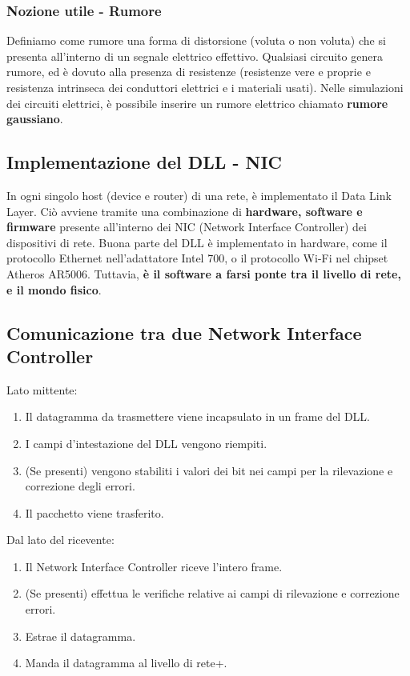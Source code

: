 \subsubsection{Nozione utile - Rumore}
Definiamo come rumore una forma di distorsione (voluta o non voluta) che si presenta all'interno di un segnale elettrico effettivo. Qualsiasi circuito genera rumore, ed è dovuto alla presenza di resistenze (resistenze vere e proprie e resistenza intrinseca dei conduttori elettrici e i materiali usati). Nelle simulazioni dei circuiti elettrici, è possibile inserire un rumore elettrico chiamato \textbf{rumore gaussiano}.

\subsection{Implementazione del DLL - NIC}
In ogni singolo host (device e router) di una rete, è implementato il Data Link Layer. Ciò avviene tramite una combinazione di \textbf{hardware, software e firmware} presente all'interno dei NIC (Network Interface Controller) dei dispositivi di rete. Buona parte del DLL è implementato in hardware, come il protocollo Ethernet nell'adattatore Intel 700, o il protocollo Wi-Fi nel chipset Atheros AR5006. Tuttavia, \textbf{è il software a farsi ponte tra il livello di rete, e il mondo fisico}.

\subsection{Comunicazione tra due Network Interface Controller}
Lato mittente:
\begin{enumerate}
	\item Il datagramma da trasmettere viene incapsulato in un frame del DLL.
	\item I campi d'intestazione del DLL vengono riempiti.
	\item (Se presenti) vengono stabiliti i valori dei bit nei campi per la rilevazione e correzione degli errori.
	\item Il pacchetto viene trasferito.
\end{enumerate}
Dal lato del ricevente:
\begin{enumerate}
	\item Il Network Interface Controller riceve l'intero frame.
	\item (Se presenti) effettua le verifiche relative ai campi di rilevazione e correzione errori.
	\item Estrae il datagramma.
	\item Manda il datagramma al livello di rete+.
\end{enumerate}


